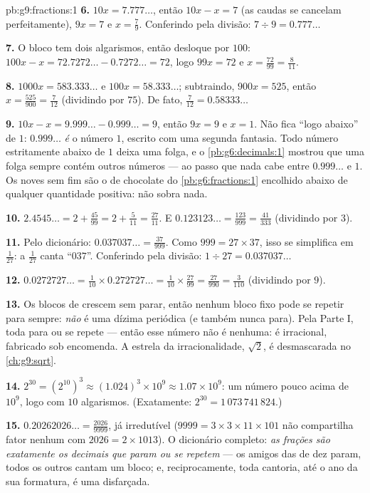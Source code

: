 \begin{solution}{pb:g9:fractions:1}
\textbf{6.} $10x = 7.777\ldots$, então $10x - x = 7$ (as caudas se
cancelam perfeitamente), $9x = 7$ e $x = \frac79$. Conferindo pela
divisão: $7 \div 9 = 0.777\ldots$

\textbf{7.} O bloco tem dois algarismos, então desloque por $100$:
$100x - x = 72.7272\ldots - 0.7272\ldots = 72$, logo $99x = 72$ e
$x = \frac{72}{99} = \frac{8}{11}$.

\textbf{8.} $1000x = 583.333\ldots$ e $100x = 58.333\ldots$;
subtraindo, $900x = 525$, então $x = \frac{525}{900} = \frac{7}{12}$
(dividindo por $75$). De fato, $\frac{7}{12} = 0.58333\ldots$

\textbf{9.} $10x - x = 9.999\ldots - 0.999\ldots = 9$, então $9x = 9$
e $x = 1$. Não fica ``logo abaixo'' de $1$: $0.999\ldots$ \emph{é} o
número $1$, escrito com uma segunda fantasia. Todo número estritamente
abaixo de $1$ deixa uma folga, e o \cref{pb:g6:decimals:1} mostrou que
uma folga sempre contém outros números --- ao passo que nada cabe entre
$0.999\ldots$ e $1$. Os noves sem fim são o  de chocolate do
\cref{pb:g6:fractions:1} encolhido abaixo de qualquer quantidade
positiva: não sobra nada.

\textbf{10.} $2.4545\ldots = 2 + \frac{45}{99} = 2 + \frac{5}{11}
= \frac{27}{11}$. E $0.123123\ldots = \frac{123}{999} =
\frac{41}{333}$ (dividindo por $3$).

\textbf{11.} Pelo dicionário: $0.037037\ldots = \frac{37}{999}$. Como
$999 = 27 \times 37$, isso se simplifica em $\frac{1}{27}$: a 
$\frac{1}{27}$ canta ``$037$''. Conferindo pela divisão:
$1 \div 27 = 0.037037\ldots$

\textbf{12.} $0.0272727\ldots = \frac{1}{10} \times 0.272727\ldots
= \frac{1}{10} \times \frac{27}{99} = \frac{27}{990} = \frac{3}{110}$
(dividindo por $9$).

\textbf{13.} Os blocos de  crescem sem parar, então nenhum bloco
fixo pode se repetir para sempre: \emph{não} é uma dízima periódica (e
também nunca para). Pela Parte I, toda  para ou se repete ---
então esse número não é  nenhuma: é irracional, fabricado sob
encomenda. A estrela da irracionalidade, $\sqrt2$, é desmascarada no
\cref{ch:g9:sqrt}.

\textbf{14.} $2^{30} = \left(2^{10}\right)^3 \approx (1.024)^3 \times
10^9 \approx 1.07 \times 10^9$: um número pouco acima de $10^9$, logo
com $10$ algarismos. (Exatamente: $2^{30} = 1\,073\,741\,824$.)

\textbf{15.} $0.20262026\ldots = \frac{2026}{9999}$, já irredutível
($9999 = 3 \times 3 \times 11 \times 101$ não compartilha fator nenhum
com $2026 = 2 \times 1013$). O dicionário completo: \emph{as frações
são exatamente os decimais que param ou se repetem} --- os
 amigos das  de dez param, todos os outros cantam
um bloco; e, reciprocamente, toda cantoria, até o ano da sua formatura,
é uma  disfarçada.
\end{solution}
